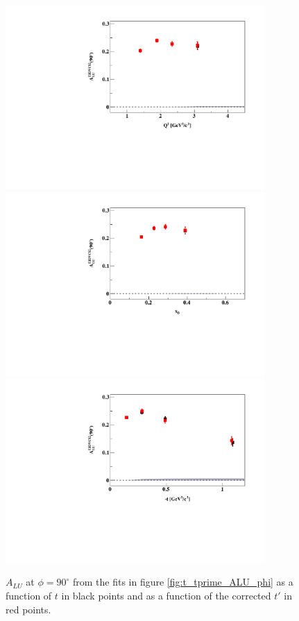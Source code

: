 \documentclass[a4paper,11pt,twoside]{article}
\begin{document}
\begin{figure}[h!]
\centering
\includegraphics[height=7.0cm]{fig/E1DVCS2-ALU_90_p_vs_Q2_shortscenrario.pdf}
\includegraphics[height=7.0cm]{fig/E1DVCS2-ALU_90_p_vs_x_shortscenrario.pdf}
\includegraphics[height=7.0cm]{fig/E1DVCS2-ALU_90_p_vs_t_shortscenrario.pdf}
\caption{$A_{LU}$ at $\phi = 90^{\circ}$ from the fits in figure 
\ref{fig:t_tprime_ALU_phi} as a function of $t$ in black points and as a 
function of the corrected $t'$ in red points.}
\label{fig:t_tprime_ALU_90}
\end{figure}
\end{document}
